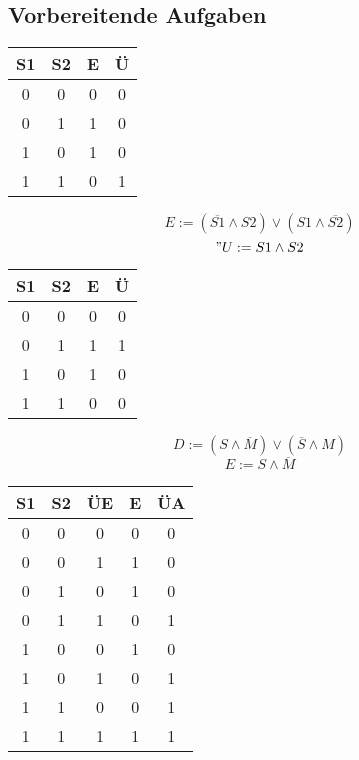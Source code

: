 \documentclass[a4paper, 11pt, fleqn, DIV=10, twoside, BCOR=10mm]{scrreprt}
\begin{document}
 
\AVier
\begin{center}
\chapter{Vorbereitende Aufgaben}
\begin{tabular}{c|c||c|c}
S1&S2&E&Ü\\
\hline
0&0&0&0\\
0&1&1&0\\
1&0&1&0\\
1&1&0&1\\
\end{tabular}
\begin{equation}
	E:=(\overline{S1} \wedge S2) \vee (S1 \wedge \overline{S2})
\end{equation}
\begin{equation}
	"U:=S1 \wedge S2
\end{equation}
%
\begin{tabular}{c|c||c|c}
S1&S2&E&Ü\\
\hline
0&0&0&0\\
0&1&1&1\\
1&0&1&0\\
1&1&0&0\\
\end{tabular}
\begin{equation}
	D:= (S \wedge \overline{M}) \vee (\overline{S} \wedge M)
\end{equation}
\begin{equation}
	E:= S \wedge \overline{M}
\end{equation}
\end{center}
%
\begin{tabular}{c|c|c||c|c}
S1&S2&ÜE&E&ÜA\\
\hline
0&0&0&0&0\\
0&0&1&1&0\\
0&1&0&1&0\\
0&1&1&0&1\\
1&0&0&1&0\\
1&0&1&0&1\\
1&1&0&0&1\\
1&1&1&1&1\\
\end{tabular}
\end{document}
